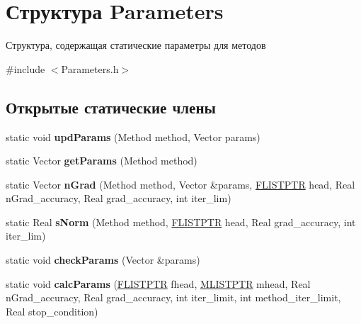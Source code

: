 \hypertarget{structParameters}{}\section{Структура Parameters}
\label{structParameters}


Структура, содержащая статические параметры для методов  




{\ttfamily \#include $<$Parameters.\+h$>$}

\subsection*{Открытые статические члены}
\begin{DoxyCompactItemize}
\item 
\mbox{\label{structParameters_a368bf1936a6e30fcf0f1b5a4684e9ed5}} 
static void {\bfseries upd\+Params} (Method method, Vector params)
\item 
\mbox{\label{structParameters_a746b5af69e00ca8a658fe534d3bdad1a}} 
static Vector {\bfseries get\+Params} (Method method)
\item 
\mbox{\label{structParameters_a2b012cce011dd93644b07eb4282771cb}} 
static Vector {\bfseries n\+Grad} (Method method, Vector \&params, \mbox{\hyperlink{structFlist}{F\+L\+I\+S\+T\+P\+TR}} head, Real n\+Grad\+\_\+accuracy, Real grad\+\_\+accuracy, int iter\+\_\+lim)
\item 
\mbox{\label{structParameters_aea4455260843154032a3550831822792}} 
static Real {\bfseries s\+Norm} (Method method, \mbox{\hyperlink{structFlist}{F\+L\+I\+S\+T\+P\+TR}} head, Real grad\+\_\+accuracy, int iter\+\_\+lim)
\item 
\mbox{\label{structParameters_aa2f181a1edb235cf869cb2b0b67c1093}} 
static void {\bfseries check\+Params} (Vector \&params)
\item 
\mbox{\label{structParameters_a7975677ffd93e4c0022582c2805b80e3}} 
static void {\bfseries calc\+Params} (\mbox{\hyperlink{structFlist}{F\+L\+I\+S\+T\+P\+TR}} fhead, \mbox{\hyperlink{structMlist}{M\+L\+I\+S\+T\+P\+TR}} mhead, Real n\+Grad\+\_\+accuracy, Real grad\+\_\+accuracy, int iter\+\_\+limit, int method\+\_\+iter\+\_\+limit, Real stop\+\_\+condition)
\end{DoxyCompactItemize}
